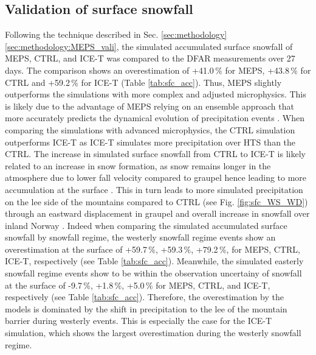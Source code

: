 \documentclass{ametsocV5}
\begin{document}
    \subsection{Validation of surface snowfall}\label{sec:res:season_sfc}
        Following the technique described in Sec. \ref{sec:methodology}\ref{sec:methodology:MEPS_vali}, the simulated accumulated surface snowfall of MEPS, CTRL, and ICE-T was compared to the DFAR measurements over 27 days. The comparison shows an overestimation of +41.0\,\% for MEPS, +43.8\,\% for CTRL and +59.2\,\% for ICE-T (Table \ref{tab:sfc_acc}). Thus, MEPS slightly outperforms the simulations with more complex and adjusted microphysics. This is likely due to the advantage of MEPS relying on an ensemble approach that more accurately predicts the dynamical evolution of precipitation events \citep{frogner_convection-permitting_2019}. When comparing the simulations with advanced microphysics, the CTRL simulation outperforms ICE-T as ICE-T simulates more precipitation over HTS than the CTRL. The increase in simulated surface snowfall from CTRL to ICE-T is likely related to an increase in snow formation, as snow remains longer in the atmosphere due to lower fall velocity compared to graupel hence leading to more accumulation at the surface \citep{engdahl_effects_2020}. This in turn leads to more simulated precipitation on the lee side of the mountains compared to CTRL (see Fig. \ref{fig:sfc_WS_WD}) through an eastward displacement in graupel and overall increase in snowfall over inland Norway \citep{engdahl_effects_2020}. Indeed when comparing the simulated accumulated surface snowfall by snowfall regime, the westerly snowfall regime events show an overestimation at the surface of +59.7\,\%, +59.3\,\%, +79.2\,\%, for MEPS, CTRL, ICE-T, respectively (see Table \ref{tab:sfc_acc}). Meanwhile, the simulated easterly snowfall regime events show to be within the observation uncertainy of snowfall at the surface of -9.7\,\%, +1.8\,\%, +5.0\,\% for MEPS, CTRL, and ICE-T, respectively (see Table \ref{tab:sfc_acc}). Therefore, the overestimation by the models is dominated by the shift in precipitation to the lee of the mountain barrier during westerly events. This is especially the case for the ICE-T simulation, which shows the largest overestimation during the westerly snowfall regime. 
        
\end{document}
